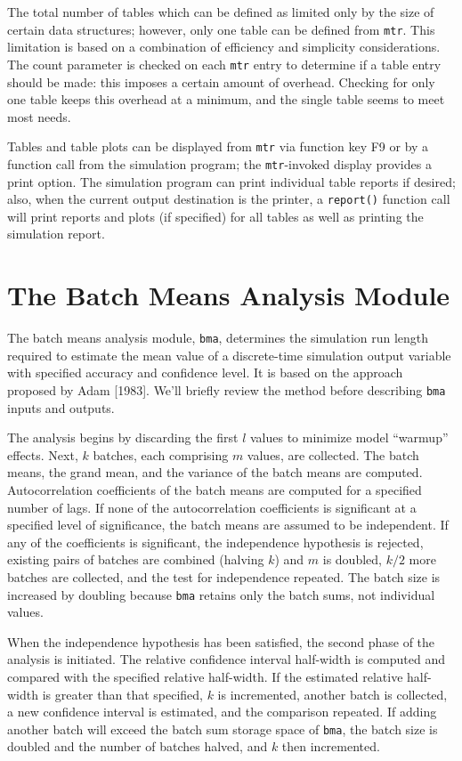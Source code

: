 The total number of tables which can be defined as limited only by the
size of certain data structures; however, only one table can be defined from
\texttt{mtr}. This limitation is based on a combination of efficiency and simplicity
considerations. The count parameter is checked on each \texttt{mtr} entry to
determine if a table entry should be made: this imposes a certain amount of
overhead. Checking for only one table keeps this overhead at a minimum,
and the single table seems to meet most needs.

Tables and table plots can be displayed from \texttt{mtr} via function key F9 or
by a function call from the simulation program; the \texttt{mtr}-invoked display
provides a print option. The simulation program can print individual table
reports if desired; also, when the current output destination is the printer, a
\texttt{report()} function call will print reports and plots (if specified) for all
tables as well as printing the simulation report.

\section{The Batch Means Analysis Module}
\label{sec:simenv-bma}

The batch means analysis module, \texttt{bma}, determines the simulation run
length required to estimate the mean value of a discrete-time simulation
output variable with specified accuracy and confidence level. It is based on
the approach proposed by Adam [1983]. We'll briefly review the method
before describing \texttt{bma} inputs and outputs.

The analysis begins by discarding the first $l$ values to minimize model
``warmup'' effects. Next, $k$ batches, each comprising $m$ values, are collected.
The batch means, the grand mean, and the variance of the batch means are
computed. Autocorrelation coefficients of the batch means are computed for a
specified number of lags. If none of the autocorrelation coefficients is
significant at a specified level of significance, the batch means are assumed
to be independent. If any of the coefficients is significant, the independence
hypothesis is rejected, existing pairs of batches are combined (halving $k$)
and $m$ is doubled, $k/2$ more batches are collected, and the test for independence
repeated. The batch size is increased by doubling because \texttt{bma} retains
only the batch sums, not individual values.

When the independence hypothesis has been satisfied, the second phase
of the analysis is initiated. The relative confidence interval half-width is
computed and compared with the specified relative half-width. If the
estimated relative half-width is greater than that specified, $k$ is incremented,
another batch is collected, a new confidence interval is estimated,
and the comparison repeated. If adding another batch will exceed the batch
sum storage space of \texttt{bma}, the batch size is doubled and the number of batches
halved, and $k$ then incremented.

